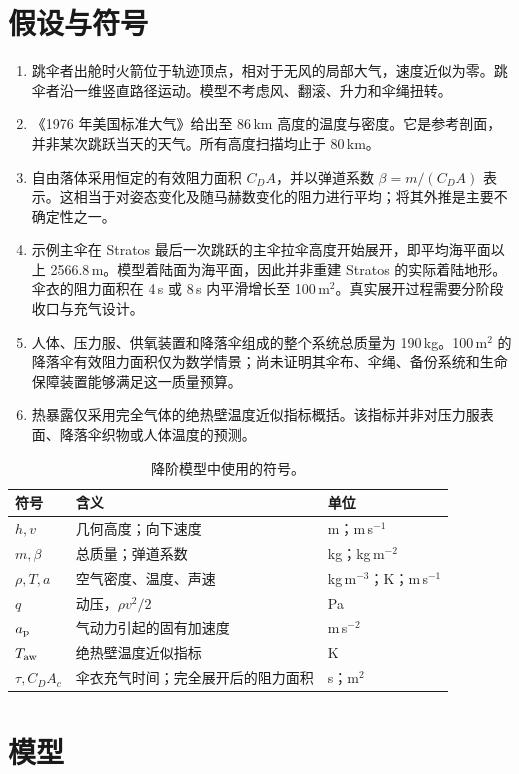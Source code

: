 \documentclass[11pt,a4paper]{article}
\begin{document}
\section{假设与符号}
\begin{enumerate}
\item 跳伞者出舱时火箭位于轨迹顶点，相对于无风的局部大气，速度近似为零。跳伞者沿一维竖直路径运动。模型不考虑风、翻滚、升力和伞绳扭转。
\item 《1976 年美国标准大气》给出至 86\,km 高度的温度与密度\cite{ussa}。它是参考剖面，并非某次跳跃当天的天气。所有高度扫描均止于 80\,km。
\item 自由落体采用恒定的有效阻力面积 $C_DA$，并以弹道系数 $\beta=m/(C_DA)$ 表示。这相当于对姿态变化及随马赫数变化的阻力进行平均；将其外推是主要不确定性之一。
\item 示例主伞在 Stratos 最后一次跳跃的主伞拉伞高度开始展开，即平均海平面以上 2566.8\,m。模型着陆面为海平面，因此并非重建 Stratos 的实际着陆地形。伞衣的阻力面积在 4\,s 或 8\,s 内平滑增长至 100\,m$^2$。真实展开过程需要分阶段收口与充气设计。
\item 人体、压力服、供氧装置和降落伞组成的整个系统总质量为 190\,kg。100\,m$^2$ 的降落伞有效阻力面积仅为数学情景；尚未证明其伞布、伞绳、备份系统和生命保障装置能够满足这一质量预算。
\item 热暴露仅采用完全气体的绝热壁温度近似指标概括。该指标并非对压力服表面、降落伞织物或人体温度的预测。
\end{enumerate}

\begin{table}[H]\centering\small
\caption{降阶模型中使用的符号。}
\begin{tabularx}{\linewidth}{lYl}\toprule
符号 & 含义 & 单位\\\midrule
$h,v$ & 几何高度；向下速度 & m；m\,s$^{-1}$\\
$m,\beta$ & 总质量；弹道系数 & kg；kg\,m$^{-2}$\\
$\rho,T,a$ & 空气密度、温度、声速 & kg\,m$^{-3}$；K；m\,s$^{-1}$\\
$q$ & 动压，$\rho v^2/2$ & Pa\\
$a_{\rm p}$ & 气动力引起的固有加速度 & m\,s$^{-2}$\\
$T_{\rm aw}$ & 绝热壁温度近似指标 & K\\
$\tau,C_DA_c$ & 伞衣充气时间；完全展开后的阻力面积 & s；m$^2$\\\bottomrule
\end{tabularx}
\end{table}

\section{模型}
\end{document}
